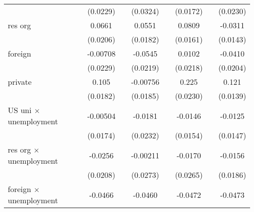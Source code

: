 \begin{table}[ht]
{\begin{tabular}{l*{8}{c}}
            &                     &    (0.0229)         &                     &    (0.0324)         &                     &    (0.0172)         &                     &    (0.0230)         \\
[1em]
res org&                     &      0.0661\sym{**} &                     &      0.0551\sym{**} &                     &      0.0809\sym{***}&                     &     -0.0311\sym{*}  \\
            &                     &    (0.0206)         &                     &    (0.0182)         &                     &    (0.0161)         &                     &    (0.0143)         \\
[1em]
foreign&                     &    -0.00708         &                     &     -0.0545\sym{**} &                     &      0.0102         &                     &     -0.0410\sym{*}  \\
            &                     &    (0.0229)         &                     &    (0.0219)         &                     &    (0.0218)         &                     &    (0.0204)         \\
[1em]
private&                     &       0.105\sym{***}&                     &    -0.00756         &                     &       0.225\sym{***}&                     &       0.121\sym{***}\\
            &                     &    (0.0182)         &                     &    (0.0185)         &                     &    (0.0230)         &                     &    (0.0139)         \\
[1em]
US uni $\times$ unemployment &                     &    -0.00504         &                     &     -0.0181         &                     &     -0.0146         &                     &     -0.0125         \\
            &                     &    (0.0174)         &                     &    (0.0232)         &                     &    (0.0154)         &                     &    (0.0147)         \\
[1em]
res org $\times$ unemployment &                     &     -0.0256         &                     &    -0.00211         &                     &     -0.0170         &                     &     -0.0156         \\
            &                     &    (0.0208)         &                     &    (0.0273)         &                     &    (0.0265)         &                     &    (0.0186)         \\
[1em]
foreign $\times$ unemployment&                     &     -0.0466\sym{**} &                     &     -0.0460\sym{**} &                     &     -0.0472\sym{***}&                     &     -0.0473\sym{**} \\

\end{tabular}}
\end{table}
